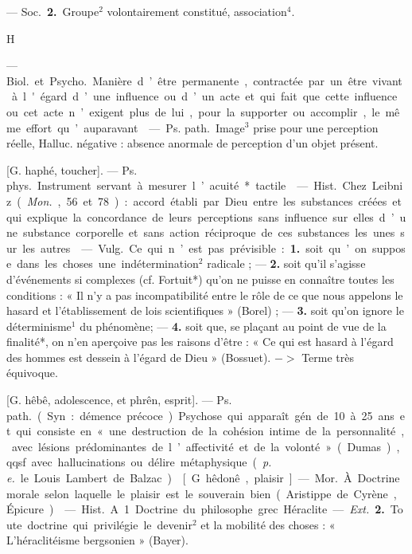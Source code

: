 \begin{itemize}[leftmargin=1cm, label=, itemsep=1pt]
— \si{Soc.} {\bf 2.} Groupe$^2$
volontairement constitué, association$^4$.

\begin{center}
H
\end{center}

 — \si{Biol.} et \si{Psycho.} Manière
d’être permanente, contractée par
un être vivant à l'égard d’une influence ou d’un acte et qui fait que
cette influence ou cet acte n’exigent
plus de lui, pour la supporter ou
accomplir, le même effort qu’auparavant.

 — \si{Ps. path.} Image$^3$
prise pour une perception réelle,
Halluc. négative : absence anormale
de perception d’un objet présent.

 [G. haphé, toucher]. — \si{Ps. phys.} Instrument servant à mesurer l’acuité* tactile.

 — \si{Hist.} Chez
Leibniz ({\it Mon.}, 56 et 78) : accord
établi par Dieu entre les substances
créées et qui explique la concordance
de leurs perceptions sans influence
sur elles d’une substance corporelle
et sans action réciproque de ces
substances les unes sur les autres.

 — \si{Vulg.} Ce qui n’est pas
prévisible : {\bf 1.} soit qu’on suppose
dans les choses une indétermination$^2$
radicale ; — {\bf 2.} soit qu'il s'agisse
d'événements si complexes (cf. Fortuit*) qu’on ne puisse en connaître
toutes les conditions : « Il n’y a pas
incompatibilité entre le rôle de ce
que nous appelons le hasard et l’établissement de lois scientifiques »
(Borel) ; — {\bf 3.} soit qu’on ignore le
déterminisme$^1$ du phénomène; —
 {\bf 4.} soit que, se plaçant au point de
vue de la finalité*, on n’en aperçoive
pas les raisons d’être : « Ce
qui est hasard à l’égard des hommes
est dessein à l'égard de Dieu » (Bossuet). $->$ Terme très équivoque.

 [G. hêbê, adolescence, et
phrên, esprit]. — \si{Ps. path.} (Syn. :
démence précoce). Psychose qui apparaît gén. de 10 à 25 ans et qui consiste en « une destruction de la cohésion intime de la personnalité, avec
lésions prédominantes de l’affectivité et de la volonté » (Dumas),
qqsf. avec hallucinations ou délire
métaphysique ({\it p. e.} le Louis Lambert
de Balzac).

 [G. hêdonê, plaisir]. —
\si{Mor.} À. Doctrine morale selon laquelle le plaisir est le souverain
bien (Aristippe de Cyrène, Épicure).

 — \si{Hist.} A.1. Doctrine du
philosophe grec Héraclite. — {\it Ext.} {\bf 2.}
Toute doctrine qui privilégie le
devenir$^2$ et la mobilité des choses :
« L’héraclitéisme bergsonien »
(Bayer).


\end{itemize}
